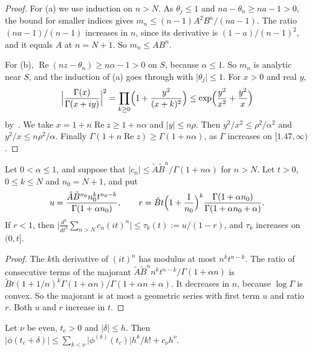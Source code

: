 \begin{proof}
For (a) we use induction on $n>N$. As $\theta_j\le1$ and
$na-\theta_n\ge na-1>0$, the bound for smaller indices gives
$m_n\le(n-1)A^2B^n/(na-1)$. The ratio $(na-1)/(n-1)$ increases in $n$, since
its derivative is $(1-a)/(n-1)^2$, and it equals $A$ at $n=N+1$. So
$m_n\le AB^n$.

For (b), $\operatorname{Re}(nz-\theta_n)\ge n\alpha-1>0$ on $S$, because
$\alpha\le1$. So $m_n$ is analytic near $S$, and the induction of (a) goes
through with $\lvert\theta_j\rvert\le1$. For $x>0$ and real $y$,
\[
 \Bigl\lvert\frac{\Gamma(x)}{\Gamma(x+iy)}\Bigr\rvert^2
 =\prod_{k\ge0}\Bigl(1+\frac{y^2}{(x+k)^2}\Bigr)
 \le\exp\Bigl(\frac{y^2}{x^2}+\frac{y^2}x\Bigr)
\]
by~\cite[5.8.3]{dlmf}. We take $x=1+n\operatorname{Re}z\ge1+n\alpha$ and
$\lvert y\rvert\le n\rho$. Then $y^2/x^2\le\rho^2/\alpha^2$ and
$y^2/x\le n\rho^2/\alpha$. Finally
$\Gamma(1+n\operatorname{Re}z)\ge\Gamma(1+n\alpha)$, as $\Gamma$ increases on
$[1.47,\infty)$.
\end{proof}

\begin{lemma}[truncation]\label{lem:thr-trunc}
Let $0<\alpha\le1$, and suppose that
$\lvert c_n\rvert\le\tilde A\tilde B^n/\Gamma(1+n\alpha)$ for $n>N$. Let $t>0$,
$0\le k\le N$ and $n_0=N+1$, and put
\[
 u=\frac{\tilde A\tilde B^{n_0}n_0^kt^{n_0-k}}{\Gamma(1+\alpha n_0)},\qquad
 r=\tilde Bt\Bigl(1+\frac1{n_0}\Bigr)^k
 \frac{\Gamma(1+\alpha n_0)}{\Gamma(1+\alpha n_0+\alpha)} .
\]
If $r<1$, then
$\bigl\lvert\frac{d^k}{dt^k}\sum_{n>N}c_n(it)^n\bigr\rvert\le\tau_k(t):=u/(1-r)$,
and $\tau_k$ increases on $(0,t]$.
\end{lemma}

\begin{proof}
The $k$th derivative of $(it)^n$ has modulus at most $n^kt^{n-k}$. The ratio
of consecutive terms of the majorant
$\tilde A\tilde B^nn^kt^{n-k}/\Gamma(1+\alpha n)$ is
$\tilde Bt(1+1/n)^k\Gamma(1+\alpha n)/\Gamma(1+\alpha n+\alpha)$. It decreases
in $n$, because $\log\Gamma$ is convex. So the majorant is at most a
geometric series with first term $u$ and ratio $r$. Both $u$ and $r$ increase
in $t$.
\end{proof}

\begin{lemma}[cells]\label{lem:thr-cells}
Let $\nu$ be even, $t_c>0$ and $\lvert\delta\rvert\le h$. Then
$\lvert\phi(t_c+\delta)\rvert\le\sum_{k<\nu}\lvert\phi^{(k)}(t_c)\rvert
h^k/k!+c_\nu h^\nu$.
\end{lemma}

